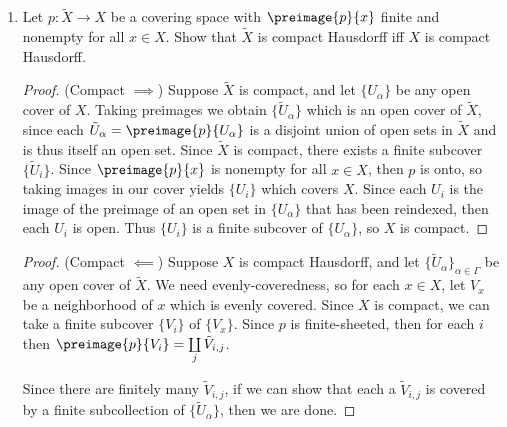 \documentclass[12pt,letterpaper]{article}
\begin{document}
\begin{enumerate}
\item Let $p:\tilde{X}\to X$ be a covering space with $\preimage{p}{x}$ finite and nonempty for all $x\in X$. Show that $\tilde{X}$ is compact Hausdorff iff $X$ is compact Hausdorff.

\begin{proof}(Compact $\implies$)
Suppose $\tilde{X}$ is compact, and let $\{U_\alpha\}$ be any open cover of $X$. Taking preimages we obtain $\{\tilde{U}_\alpha\}$ which is an open cover of $\tilde{X}$, since each $\tilde{U}_\alpha=\preimage{p}{U_\alpha}$ is a disjoint union of open sets in $\tilde{X}$ and is thus itself an open set. Since $\tilde{X}$ is compact, there exists a finite subcover $\{\tilde{U}_i\}$. Since $\preimage{p}{x}$ is nonempty for all $x\in X$, then $p$ is onto, so taking images in our cover yields $\{U_i\}$ which covers $X$. Since each $U_i$ is the image of the preimage of an open set in $\{U_\alpha\}$ that has been reindexed, then each $U_i$ is open. Thus $\{U_i\}$ is a finite subcover of $\{U_\alpha\}$, so $X$ is compact. \qedwhitehere
\end{proof}

\begin{proof}(Compact $\impliedby$)
Suppose $X$ is compact Hausdorff, and let $\{\tilde{U}_\alpha\}_{\alpha\in\Gamma}$ be any open cover of $\tilde{X}$. We need evenly-coveredness, so for each $x\in X$, let $V_x$ be a neighborhood of $x$ which is evenly covered. Since $X$ is compact, we can take a finite subcover $\{V_i\}$ of $\{V_x\}$. Since $p$ is finite-sheeted, then for each $i$ then $\preimage{p}{V_i}=\coprod\limits_{j} \tilde{V}_{i,j}$. %

Since there are finitely many $\tilde{V}_{i,j}$, if we can show that each a $\tilde{V}_{i,j}$ is covered by a finite subcollection of $\{\tilde{U}_\alpha\}$, then we are done.


\end{proof}
\end{enumerate}
\end{document}
